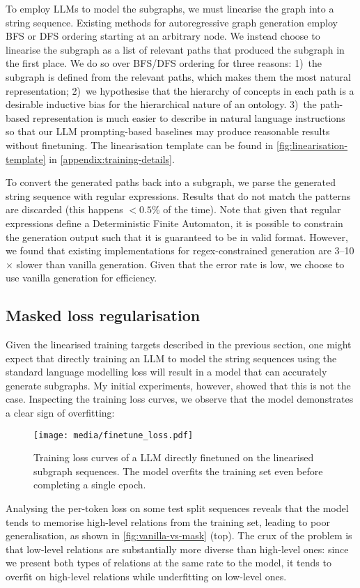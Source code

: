 To employ LLMs to model the subgraphs, we must linearise the graph into a string sequence. Existing methods for autoregressive graph generation employ BFS \cite{you2018graphrnn} or DFS \cite{goyal2020graphgen} ordering starting at an arbitrary node. We instead choose to linearise the subgraph as a list of relevant paths that produced the subgraph in the first place. We do so over BFS/DFS ordering for three reasons: 1)~the subgraph is defined from the relevant paths, which makes them the most natural representation; 2)~we hypothesise that the hierarchy of concepts in each path is a desirable inductive bias for the hierarchical nature of an ontology. 3)~the path-based representation is much easier to describe in natural language instructions so that our LLM prompting-based baselines may produce reasonable results without finetuning. The linearisation template can be found in \cref{fig:linearisation-template} in \cref{appendix:training-details}.

To convert the generated paths back into a subgraph, we parse the generated string sequence with regular expressions. Results that do not match the patterns are discarded (this happens $< 0.5\%$ of the time). Note that given that regular expressions define a Deterministic Finite Automaton, it is possible to constrain the generation output such that it is guaranteed to be in valid format. However, we found that existing implementations \cite{willard2023efficient} for regex-constrained generation are 3--10$\times$ slower than vanilla generation. Given that the error rate is low, we choose to use vanilla generation for efficiency.

\subsection{Masked loss regularisation}

Given the linearised training targets described in the previous section, one might expect that directly training an LLM to model the string sequences using the standard language modelling loss will result in a model that can accurately generate subgraphs. My initial experiments, however, showed that this is not the case. Inspecting the training loss curves, we observe that the model demonstrates a clear sign of overfitting:
\begin{figure}[H]
    \centering
    \texttt{[image: media/finetune\_loss.pdf]}
    \captionsetup{width=0.6\linewidth}
    \caption{Training loss curves of a LLM directly finetuned on the linearised subgraph sequences. The model overfits the training set even before completing a single epoch.}
\end{figure}
Analysing the per-token loss on some test split sequences reveals that the model tends to memorise high-level relations from the training set, leading to poor generalisation, as shown in \cref{fig:vanilla-vs-mask} (top). The crux of the problem is that low-level relations are substantially more diverse than high-level ones: since we present both types of relations at the same rate to the model, it tends to overfit on high-level relations while underfitting on low-level ones.

